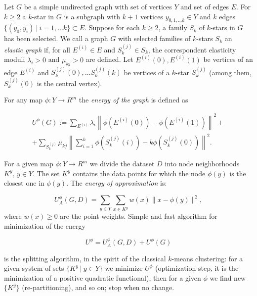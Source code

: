 \documentclass[preprint,12pt,twocolumn]{elsarticle}
\begin{document}
Let $G$ be a simple undirected graph with set of vertices $Y$ and
set of edges $E$. For $k \geq 2$ a $k$-star in $G$ is a subgraph
with $k+1$ vertices $y_{0,1, \ldots k} \in Y$ and $k$ edges $\{(y_0,
y_i) \ | \ i=1,\ldots k\} \subset E$. Suppose for each $k\geq 2$, a
family $S_k$ of $k$-stars in $G$ has been selected. We call a graph
$G$ with selected families of $k$-stars $S_k$ an {\it elastic graph}
if, for all $E^{(i)} \in E $ and $S^{(j)}_k \in S_k$, the
correspondent elasticity moduli $\lambda_i > 0$ and $\mu_{kj}
> 0$ are defined. Let  $E^{(i)}(0),E^{(i)}(1)$ be vertices of an
edge $E^{(i)}$ and $S^{(j)}_k (0),\ldots S^{(j)}_k (k)$ be vertices
of a $k$-star  $S^{(j)}_k $ (among them, $S^{(j)}_k (0)$ is the
central vertex).

For any map $\phi:Y \to R^m$ the {\it energy of the
graph} is defined as


\begin{equation}\label{elastic_energy}
\begin{split}
U^{\phi}{(G)}:=  \sum_{E^{(i)}} \lambda_i
\left\|\phi(E^{(i)}(0))-\phi(E^{(i)}(1)) \right\| ^2 + \\
+ \sum_{S^{(j)}_k}\mu_{kj} \left\|\sum _ {i=1}^k \phi(S^{(j)}_k
(i))-k\phi(S^{(j)}_k (0)) \right\|^2. \nonumber
\end{split}
\end{equation}

For a given map $\phi: Y \to R^m$ we divide the dataset $D$ into
node neighborhoods $K^y, \, y\in Y$. The set $K^y$ contains the data points for
which the node $\phi(y)$ is the closest one in $\phi(y)$. The {\it
energy of approximation} is:

\begin{equation}\label{approximation_term}
U^{\phi}_A(G,D)= \sum_{y \in Y} \sum_{ x \in K^y} w(x) \|x-
\phi(y)\|^2,
\end{equation}
where $w(x) \geq 0$ are the point weights. Simple and fast algorithm for minimization of the energy

\begin{equation}\label{globalStandardEnergy}
U^{\phi}=U^{\phi}_A(G,D)+U^{\phi}{(G)}
\end{equation}

\noindent is the splitting algorithm, in the spirit of the classical $k$-means clustering: for a given
system of sets $\{K^y \ | \ y \in Y \}$ we minimize $U^{\phi}$ (optimization step, it
is the minimization of a positive quadratic functional), then for a
given $\phi$ we find new $\{K^y\}$ (re-partitioning), and so on; stop when no change.
\end{document}
